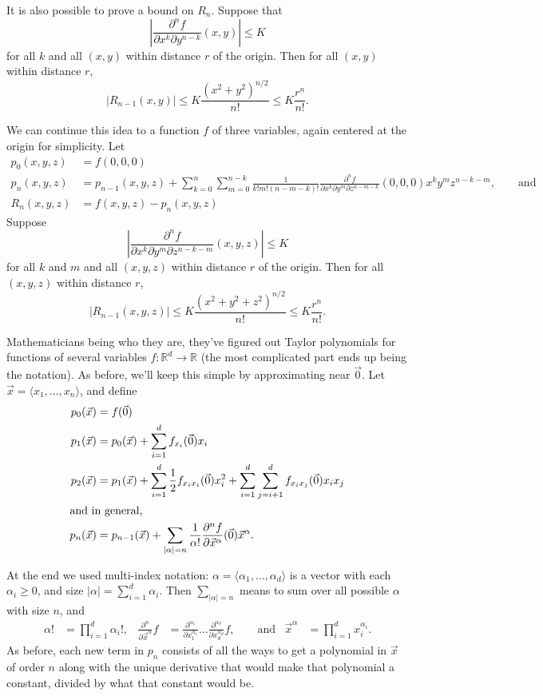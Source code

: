 \documentclass{amsart}
\newcommand{\BBR}{\mathbb{R}}
\newcommand{\abs}[1]{\left\lvert#1\right\rvert}
\newcommand{\Ovec}{\vec0}
\newcommand{\xvec}{\vec x}
\begin{document}
It is also possible to prove a bound on $R_n$.  Suppose that
\[\abs{\frac{\partial^n f}{\partial x^k\partial y^{n-k}}(x,y)}\le K\]
for all $k$ and all $(x,y)$ within distance $r$ of the origin. Then for all $(x,y)$ within distance $r$,
\[
 \abs{R_{n-1}(x,y)}
 \le K\frac{(x^2+y^2)^{n/2}}{n!}
 \le K\frac{r^n}{n!}.
\]


We can continue this idea to a function $f$ of three variables, again centered at the origin for simplicity.  Let
\begin{align*}
 p_0(x,y,z) &= f(0,0,0) \\
 p_n(x,y,z) &= p_{n-1}(x,y,z) + \sum_{k=0}^n\sum_{m=0}^{n-k}\frac1{k!m!(n-m-k)!}\frac{\partial^n f}{\partial x^k\partial y^m\partial z^{n-m-k}}(0,0,0)x^k y^m z^{n-k-m}, \qquad\text{and}\\
 R_n(x,y,z) &= f(x,y,z)-p_n(x,y,z)
\end{align*}
Suppose
\[\abs{\frac{\partial^n f}{\partial x^k\partial y^m\partial z^{n-k-m}}(x,y,z)}\le K\]
for all $k$ and $m$ and all $(x,y,z)$ within distance $r$ of the origin. Then for all $(x,y,z)$ within distance $r$,
\[
 \abs{R_{n-1}(x,y,z)}
 \le K\frac{(x^2+y^2+z^2)^{n/2}}{n!}
 \le K\frac{r^n}{n!}.
\]


Mathematicians being who they are, they've figured out Taylor polynomials for functions of several variables $f:\BBR^d\to\BBR$ (the most complicated part ends up being the notation). As before, we'll keep this simple by approximating near $\Ovec$. Let $\xvec=\langle x_1,\dotsc,x_n\rangle$, and define
\begin{align*}
 p_0(\xvec) & = f(\Ovec) \\
 p_1(\xvec) & = p_0(\xvec)+\sum_{i=1}^d f_{x_i}(\Ovec)x_i \\
 p_2(\xvec) & = p_1(\xvec)+\sum_{i=1}^d \frac12f_{x_ix_i}(\Ovec)x_i^2
 +\sum_{i=1}^d\sum_{j=i+1}^d f_{x_ix_j}(\Ovec)x_ix_j \\
 \intertext{and in general,}
 p_n(\xvec) & = p_{n-1}(\xvec) +
 \sum_{\abs\alpha=n}\frac1{\alpha!}\frac{\partial^n f}{\partial\xvec^\alpha}
 (\Ovec)\xvec^\alpha.
\end{align*}

At the end we used multi-index notation: $\alpha=\langle\alpha_1,\dotsc,\alpha_d\rangle$ is a vector with each $\alpha_i\ge 0$, and size $\abs\alpha=\sum_{i=1}^d\alpha_i$. Then $\sum_{\abs\alpha=n}$ means to sum over all possible $\alpha$ with size $n$, and
\begin{align*}
 \alpha! & = \prod_{i=1}^d \alpha_i!, &
 \frac{\partial^n}{\partial\xvec^\alpha}f
 & = \frac{\partial^{\alpha_1}}{\partial x_1^{\alpha_1}}
 \dotso\frac{\partial^{\alpha_d}}{\partial x_d^{\alpha_d}}f,\qquad\text{and} &
 \xvec^\alpha & = \prod_{i=1}^d x_i^{\alpha_i}.
\end{align*}
As before, each new term in $p_n$ consists of all the ways to get a polynomial in $\xvec$ of order $n$ along with the unique derivative that would make that polynomial a constant, divided by what that constant would be.
\end{document}
